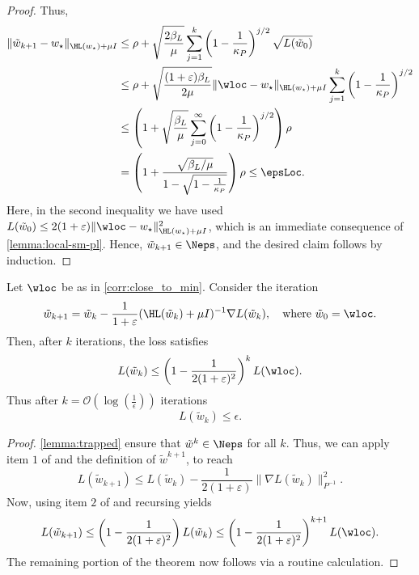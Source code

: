 \begin{proof}
  Thus,
  \begin{align*}
  \|\tilde w_{k+1}-w_\star\|_{\HL(w_\star)+\mu I} &\leq \rho+\sqrt{\frac{2\beta_L}{\mu}}\sum_{j=1}^{k}\left(1-\frac{1}{\kappa_P}\right)^{j/2}\sqrt{L(\tilde w_0)} \\
  &\leq \rho+\sqrt{\frac{(1+\varepsilon)\beta_L}{2\mu}}\|\wloc - w_\star\|_{\HL(w_\star)+\mu I}\sum_{j=1}^{k}\left(1-\frac{1}{\kappa_P}\right)^{j/2}\\
  &\leq \left(1+\sqrt{\frac{\beta_L}{\mu}}\sum_{j=0}^{\infty}\left(1-\frac{1}{\kappa_P}\right)^{j/2}\right)\rho\\
  & = \left(1+\frac{\sqrt{\beta_L/\mu}}{{1-\sqrt{1-\frac{1}{\kappa_P}}}}\right)\rho\leq \epsLoc.
  \end{align*}
  Here, in the second inequality we have used $L(\tilde w_0)\leq 2(1+\varepsilon)\|\wloc - w_\star\|^2_{\HL(w_\star)+\mu I}$, which is an immediate consequence of \cref{lemma:local-sm-pl}.
  Hence, $\tilde w_{k+1}\in \Neps$, and the desired claim follows by induction. 
\end{proof}

\begin{theorem}
\label{thm:dn_fast_loc}
    Let $\wloc$ be as in \cref{corr:close_to_min}. 
    Consider the iteration 
    \[
    \tilde w_{k+1} = \tilde w_k-\frac{1}{1+\varepsilon}(\HL(\tilde w_k)+\mu I)^{-1}\nabla L(\tilde w_k),\quad \text{where}~\tilde w_0 = \wloc.\] 
    Then, after $k$ iterations, the loss satisfies
        \[
        L(\tilde w_k) \leq \left(1-\frac{1}{2(1+\varepsilon)^2}\right)^{k}L(\wloc).
        \]
        Thus after $k = \mathcal O\left(\log\left(\frac{1}{\epsilon}\right)\right)$ iterations
        \[
        L(\tilde w_k)\leq \epsilon.
        \]
    \begin{proof}
        \cref{lemma:trapped} ensure that $\tilde w^{k} \in \Neps$ for all $k$.
         Thus, we can apply item $1$ of  and the definition of $\tilde w^{k+1}$, to reach
         \[
         L(\tilde w_{k+1})\leq L(\tilde w_{k})-\frac{1}{2(1+\varepsilon)}\|\nabla L(\tilde w_k)\|_{P^{-1}}^2. 
         \]
         Now, using item $2$ of  and recursing yields  
         \[
         L(\tilde w_{k+1})\leq \left(1-\frac{1}{2(1+\varepsilon)^2}\right)L(\tilde w_k)\leq \left(1-\frac{1}{2(1+\varepsilon)^2}\right)^{k+1}L(\wloc).
         \]
         The remaining portion of the theorem now follows via a routine calculation.
    \end{proof}
\end{theorem}

